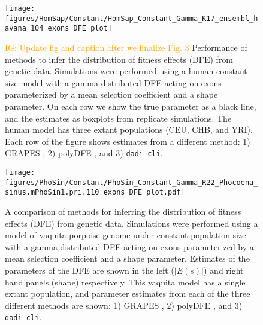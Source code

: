 \documentclass[hidelinks]{article}
\newcommand{\dadicli}{\texttt{dadi-cli}\xspace}
\newcommand{\igcomment}[1]{\textcolor{orange}{IG: #1}}
\begin{document}
\begin{figure}[h]
    \centering
    \texttt{[image: figures/HomSap/Constant/HomSap\_Constant\_Gamma\_K17\_ensembl\_havana\_104\_exons\_DFE\_plot]}
    \caption{
    \igcomment{Update fig and caption after we finalize Fig. 3}
    Performance of methods to infer the distribution of fitness effects (DFE) from genetic data.
    Simulations were performed using a human constant size model with a gamma-distributed DFE
    acting on exons parameterized by a mean selection coefficient and a shape parameter. On each row we show the true parameter 
    as a black line, and the estimates as boxplots from replicate simulations. The human model has three extant populations (CEU, CHB, and YRI).
    Each row of the figure shows estimates from a different method: 1) GRAPES \citep{galtier2016adaptive}, 2) polyDFE \citep{tataru2020polydfe}, and 3) \dadicli \citep{Huang2023}.
    }
    \label{fig:homsap-dfe.constant}    
\end{figure}

\begin{figure}
    \centering
    \texttt{[image: figures/PhoSin/Constant/PhoSin\_Constant\_Gamma\_R22\_Phocoena\_sinus.mPhoSin1.pri.110\_exons\_DFE\_plot.pdf]}
    \caption{
    \label{fig:vaquita-dfe.constant}
    A comparison of methods for inferring the distribution of fitness effects (DFE) from genetic data.
    Simulations were performed using a model of vaquita porpoise genome under constant population size with a gamma-distributed DFE
    acting on exons parameterized by a mean selection coefficient and a shape parameter. Estimates of the 
    parameters of the DFE are shown in the left ($\lvert E(s) \rvert $) and right hand panels (shape) respectively.
    This vaquita model has a single extant population, and parameter estimates from each
    of the three different methods are shown: 1) GRAPES \citep{galtier2016adaptive}, 2) polyDFE \citep{tataru2020polydfe},
    and 3) \dadicli \citep{Huang2023}.}
\end{figure}
\end{document}
